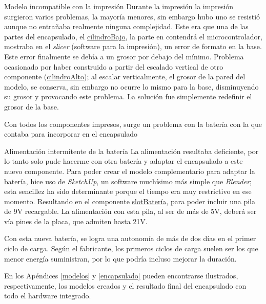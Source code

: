 \begin{problemas}{Modelo incompatible con la impresión}
    \color{mitexto}
    Durante la impresión la impresión surgieron varios problemas, la mayoría menores,
    sin embargo hubo uno se resistió aunque no entrañaba realmente ninguna complejidad.
    Este era que una de las partes del encapsulado, el
    \href{https://github.com/AntonioPriego/SmartPen/tree/main/SmartPenModel/Components/cilindroBajo}{cilindroBajo},
    la parte en contendrá el microcontrolador, mostraba en el \textit{slicer} (software
    para la impresión), un error de formato en la base. Este error finalmente se debía
    a un grosor por debajo del mínimo. Problema ocasionado por haber construido
    a partir del escalado vertical de otro componente
    (\href{https://github.com/AntonioPriego/SmartPen/tree/main/SmartPenModel/Components/cilindroAlto}{cilindroAlto});
    al escalar verticalmente, el grosor de la pared del modelo, se conserva, sin embargo
    no ocurre lo mismo para la base, disminuyendo su grosor y provocando este problema.
    La solución fue simplemente redefinir el grosor de la base.
\end{problemas}

Con todos los componentes impresos, surge un problema con la batería con la que contaba
para incorporar en el encapsulado

\begin{problemas}{Alimentación intermitente de la batería}
    \color{mitexto}
    La alimentación resultaba deficiente, por lo tanto solo pude hacerme con
    otra batería y adaptar el encapsulado a este nuevo componente.
    Para poder crear el modelo complementario para adaptar la batería, hice uso
    de \textit{SketchUp}, un software muchísimo más simple que \textit{Blender};
    esta sencillez ha sido determinante porque el tiempo era muy restrictivo en ese momento.
    Resultando en el componente
    \href{https://github.com/AntonioPriego/SmartPen/tree/main/SmartPenModel/Components/slotBateria}{slotBatería},
    para poder incluir una pila de 9V recargable. La alimentación con esta pila, al ser de más
    de 5V, deberá ser vía pines de la placa, que admiten hasta 21V.
\end{problemas}

Con esta nueva batería, se logra una autonomía de más de dos días en el primer ciclo
de carga. Según el fabricante, los primeros ciclos de carga suelen ser los que menor
energía suministran, por lo que podría incluso mejorar la duración.

En los Apéndices \ref{modelos} y \ref{encapsulado} pueden encontrarse ilustrados,
respectivamente, los modelos creados y el resultado final del encapsulado con
todo el hardware integrado.